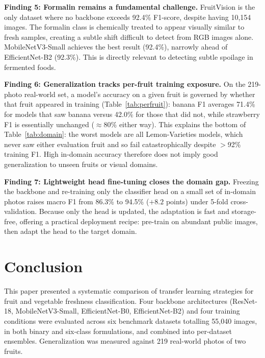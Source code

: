 \documentclass[conference]{IEEEtran}
\begin{document}
\textbf{Finding 5: Formalin remains a fundamental challenge.}
FruitVision is the only dataset where no backbone exceeds 92.4\% F1-score,
despite having 10,154 images.
The formalin class is chemically treated to appear visually similar to
fresh samples, creating a subtle shift difficult to detect from RGB images
alone.
MobileNetV3-Small achieves the best result (92.4\%), narrowly ahead of
EfficientNet-B2 (92.3\%).
This is directly relevant to detecting subtle spoilage in fermented foods.

\textbf{Finding 6: Generalization tracks per-fruit training exposure.}
On the 219-photo real-world set, a model's accuracy on a given fruit is
governed by whether that fruit appeared in training
(Table~\ref{tab:perfruit}): banana F1 averages 71.4\% for models that saw
banana versus 42.0\% for those that did not, while strawberry F1 is
essentially unchanged ($\approx$80\% either way).
This explains the bottom of Table~\ref{tab:domain}: the worst models are
all Lemon-Varieties models, which never saw either evaluation fruit and so
fail catastrophically despite $>$92\% training F1.
High in-domain accuracy therefore does not imply good generalization to
unseen fruits or visual domains.

\textbf{Finding 7: Lightweight head fine-tuning closes the domain gap.}
Freezing the backbone and re-training only the classifier head on a small
set of in-domain photos raises macro F1 from 86.3\% to 94.5\%
($+8.2$ points) under 5-fold cross-validation.
Because only the head is updated, the adaptation is fast and storage-free,
offering a practical deployment recipe: pre-train on abundant public
images, then adapt the head to the target domain.

\section{Conclusion}
\label{sec:conclusion}

This paper presented a systematic comparison of transfer learning
strategies for fruit and vegetable freshness classification.
Four backbone architectures (ResNet-18, MobileNetV3-Small,
EfficientNet-B0, EfficientNet-B2) and four training conditions were
evaluated across six benchmark datasets totalling 55,040 images, in both
binary and six-class formulations, and combined into per-dataset
ensembles.
Generalization was measured against 219 real-world photos of two fruits.
\end{document}

